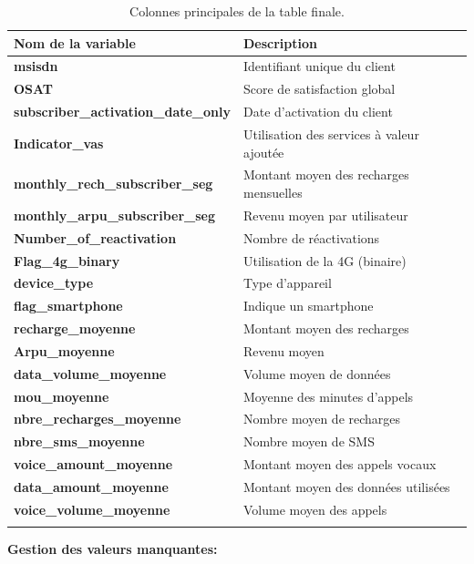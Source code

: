 \begin{longtable}{|p{7cm}|p{9cm}|}
    \hline
    \textbf{Nom de la variable} & \textbf{Description} \\ \hline
    \textbf{msisdn} & Identifiant unique du client \\ \hline
    \textbf{OSAT} & Score de satisfaction global \\ \hline
    \textbf{subscriber\_activation\_date\_only} & Date d'activation du client \\ \hline
    \textbf{Indicator\_vas} & Utilisation des services à valeur ajoutée \\ \hline
    \textbf{monthly\_rech\_subscriber\_seg} & Montant moyen des recharges mensuelles \\ \hline
    \textbf{monthly\_arpu\_subscriber\_seg} & Revenu moyen par utilisateur \\ \hline
    \textbf{Number\_of\_reactivation} & Nombre de réactivations \\ \hline
    \textbf{Flag\_4g\_binary} & Utilisation de la 4G (binaire) \\ \hline
    \textbf{device\_type} & Type d'appareil \\ \hline
    \textbf{flag\_smartphone} & Indique un smartphone \\ \hline
    \textbf{recharge\_moyenne} & Montant moyen des recharges \\ \hline
    \textbf{Arpu\_moyenne} & Revenu moyen \\ \hline
    \textbf{data\_volume\_moyenne} & Volume moyen de données \\ \hline
    \textbf{mou\_moyenne} & Moyenne des minutes d'appels \\ \hline
    \textbf{nbre\_recharges\_moyenne} & Nombre moyen de recharges \\ \hline
    \textbf{nbre\_sms\_moyenne} & Nombre moyen de SMS \\ \hline
    \textbf{voice\_amount\_moyenne} & Montant moyen des appels vocaux \\ \hline
    \textbf{data\_amount\_moyenne} & Montant moyen des données utilisées \\ \hline
    \textbf{voice\_volume\_moyenne} & Volume moyen des appels \\ \hline
\caption{Colonnes principales de la table finale.}
\label{table:variables_final}
\end{longtable}
\textbf{\checkmark Gestion des valeurs manquantes:}
